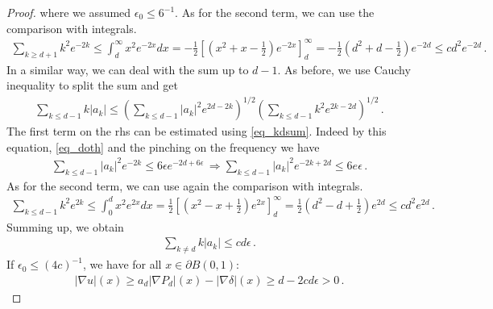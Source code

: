 \documentclass[11pt]{article}
\begin{document}
\begin{proof}
where we assumed $\epsilon_0\leq 6^{-1}$. As for the second term, we can use the comparison with integrals.
\begin{gather}
 \sum_{k\geq d+1} k^2e^{-2k}  \leq \int_d^\infty x^2 e^{-2x} dx = -\frac 1 2 {\left[{ {\left({x^2+x-\frac 1 2 }\right)} e^{-2x} }\right]}_d^\infty = -\frac 1 2 {\left({d^2+d-\frac 1 2 }\right)} e^{-2d} \leq cd^2 e^{-2d}\, .
\end{gather}
In a similar way, we can deal with the sum up to $d-1$. As before, we use Cauchy inequality to split the sum and get
\begin{gather}
 \sum_{k\leq d-1} k{\left|{a_k}\right|} \leq {\left({\sum_{k\leq d-1} {\left|{a_k}\right|}^2 e^{2d-2k} }\right)}^{1/2}{\left({\sum_{k\leq d-1} k^2e^{2k-2d}  }\right)}^{1/2}\, .
\end{gather}
The first term on the rhs can be estimated using \eqref{eq_kdsum}. Indeed by this equation, \eqref{eq_doth} and the pinching on the frequency we have
\begin{gather}
 \sum_{k\leq d-1} {\left|{a_k}\right|}^2 e^{-2k} \leq 6\epsilon e^{-2d+6\epsilon} \, \Longrightarrow   \sum_{k\leq d-1} {\left|{a_k}\right|}^2 e^{-2k+2d} \leq 6e\epsilon\, .
\end{gather}
As for the second term, we can use again the comparison with integrals.
\begin{gather}
 \sum_{k\leq d-1} k^2e^{2k}  \leq \int_0^d x^2 e^{2x} dx = \frac 1 2 {\left[{ {\left({x^2-x+\frac 1 2 }\right)} e^{2x} }\right]}_d^\infty = \frac 1 2 {\left({d^2-d+\frac 1 2 }\right)} e^{2d} \leq cd^2 e^{2d}\, .
\end{gather}
Summing up, we obtain
\begin{gather}
 \sum_{k\neq d } k{\left|{a_k}\right|} \leq cd\epsilon\, .
\end{gather}
If $\epsilon_0\leq (4c)^{-1}$, we have for all $x\in \partial B(0,1)$:
\begin{gather}
 {\left|{\nabla u}\right|}(x) \geq a_d {\left|{\nabla P_d}\right|}(x) - {\left|{\nabla \delta}\right|}(x) \geq d -2cd\epsilon >0\, .
\end{gather}
\end{proof}
\end{document}
